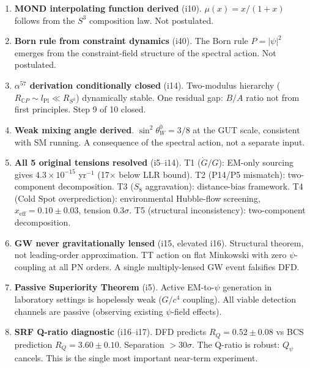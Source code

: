 \documentclass[11pt,a4paper]{article}
\newcommand{\CP}{\mathbb{C}P}
\begin{document}
\begin{enumerate}[resume, label=\textbf{B\arabic*.}, leftmargin=2cm]

\item \textbf{MOND interpolating function derived} (i10). $\mu(x) = x/(1+x)$ follows from the $S^3$ composition law. Not postulated.

\item \textbf{Born rule from constraint dynamics} (i40). The Born rule $P = |\psi|^2$ emerges from the constraint-field structure of the spectral action. Not postulated.

\item \textbf{$\alpha^{57}$ derivation conditionally closed} (i14). Two-modulus hierarchy ($R_{\CP} \sim l_\text{Pl} \ll R_{S^3}$) dynamically stable. One residual gap: $B/A$ ratio not from first principles. Step 9 of 10 closed.

\item \textbf{Weak mixing angle derived}. $\sin^2\theta_W^0 = 3/8$ at the GUT scale, consistent with SM running. A consequence of the spectral action, not a separate input.

\item \textbf{All 5 original tensions resolved} (i5--i14). T1 ($\dot{G}/G$): EM-only sourcing gives $4.3 \times 10^{-15}$ yr$^{-1}$ (17$\times$ below LLR bound). T2 (P14/P5 mismatch): two-component decomposition. T3 ($S_8$ aggravation): distance-bias framework. T4 (Cold Spot overprediction): environmental Hubble-flow screening, $x_\text{eff} = 0.10 \pm 0.03$, tension $0.3\sigma$. T5 (structural inconsistency): two-component decomposition.

\item \textbf{GW never gravitationally lensed} (i15, elevated i16). Structural theorem, not leading-order approximation. TT action on flat Minkowski with zero $\psi$-coupling at all PN orders. A single multiply-lensed GW event falsifies DFD.

\item \textbf{Passive Superiority Theorem} (i5). Active EM-to-$\psi$ generation in laboratory settings is hopelessly weak ($G/c^4$ coupling). All viable detection channels are passive (observing existing $\psi$-field effects).

\item \textbf{SRF Q-ratio diagnostic} (i16--i17). DFD predicts $R_Q = 0.52 \pm 0.08$ vs BCS prediction $R_Q = 3.60 \pm 0.10$. Separation $>30\sigma$. The Q-ratio is robust: $Q_\psi$ cancels. This is the single most important near-term experiment.

\end{enumerate}
\end{document}
